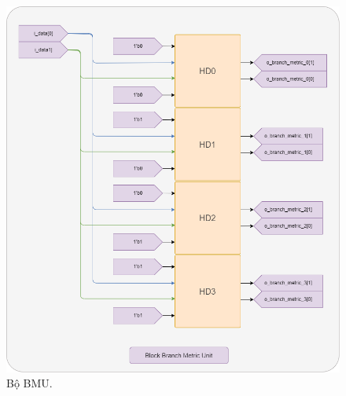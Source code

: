 \begin{figure}[H]
	\centering
	\includegraphics[width=.8\linewidth]{sections/pic/mophongbangSystemVerilog/BM_unit.png}
	\caption{Bộ BMU.}
\end{figure}


